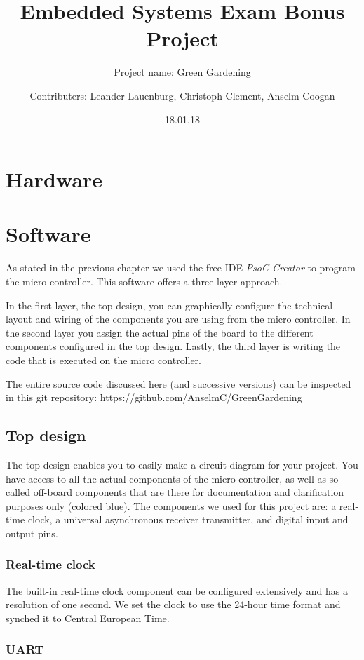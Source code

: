 \documentclass[11pt, oneside]{scrartcl}   	%
\title{Embedded Systems Exam Bonus Project}
\subtitle{Project name: Green Gardening}
\author{Contributers: Leander Lauenburg, Christoph Clement, Anselm Coogan}
\date{18.01.18}
\begin{document}
\maketitle
\section{Hardware}
\section{Software}

As stated in the previous chapter we used the free IDE \emph{PsoC Creator} to program the micro controller. This software offers a three layer approach. 

In the first layer, the top design, you can graphically configure the technical layout and wiring of the components you are using from the micro controller. In the second layer you assign the actual pins of the board to the different components configured in the top design. Lastly, the third layer is writing the code that is executed on the micro controller.

The entire source code discussed here (and successive versions) can be inspected in this git repository: https://github.com/AnselmC/GreenGardening

\subsection{Top design}

The top design enables you to easily make a circuit diagram for your project. You have access to all the actual components of the micro controller, as well as so-called off-board components that are there for documentation and clarification purposes only (colored blue). The components we used for this project are: a real-time clock, a universal asynchronous receiver transmitter, and digital input and output pins.

\subsubsection{Real-time clock}

The built-in real-time clock component can be configured extensively and has a resolution of one second. We set the clock to use the 24-hour time format and synched it to Central European Time.

\subsubsection{UART}
\end{document}
